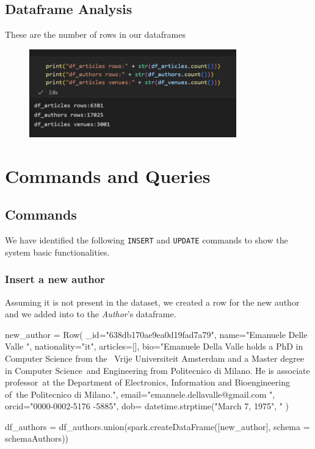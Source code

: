 \documentclass{Configuration_Files/PoliMi3i_thesis}
\begin{document}
\newpage
\section{Dataframe Analysis}
These are the number of rows in our dataframes
\begin{figure}[H]
\centering
\includegraphics[width=0.8\textwidth]{dataframe_rows.PNG}
\label{fig:dataframe_dim}
\end{figure}



\chapter{Commands and Queries}
\label{ch:ceq}
\section{Commands}
We have identified the following \verb |INSERT| and \verb |UPDATE| commands to show the system basic functionalities.

\subsection{Insert a new author}
\label{auth_insert}
Assuming it is not present in the dataset, we created a row for the new author and we added into to the \emph{Author}'s dataframe.\newline
\begin{python}
new_author = Row(
    _id="638db170ae9ea0d19fad7a79",
    name="Emanuele Delle Valle ",
    nationality="it",
    articles=[],
    bio="Emanuele Della Valle holds a PhD in Computer Science from the \
        Vrije Universiteit Amsterdam and a Master degree in Computer Science\
        and Engineering from Politecnico di Milano. He is associate professor\
        at the Department of Electronics, Information and Bioengineering of\
        the Politecnico di Milano.",
    email="emanuele.dellavalle@gmail.com ",
    orcid="0000-0002-5176 -5885",
    dob= datetime.strptime("March 7, 1975", "%
)

df_authors = df_authors.union(spark.createDataFrame([new_author], schema = schemaAuthors))
\end{python}
\end{document}
